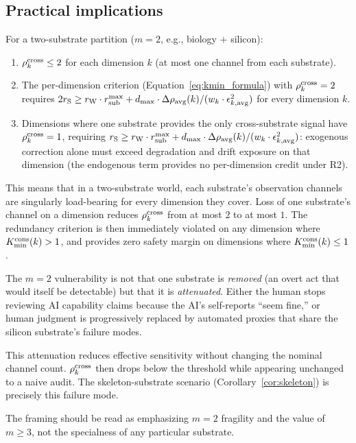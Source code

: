 \subsection{Practical implications}

\begin{corollary}
\label{cor:two_substrate}
For a two-substrate partition ($m = 2$, e.g., biology $+$ silicon):
\begin{enumerate}
\item $\rho^{\mathrm{cross}}_k \leq 2$ for each dimension $k$ (at most one channel
  from each substrate).
\item The per-dimension criterion
  (Equation~\ref{eq:kmin_formula}) with $\rho^{\mathrm{cross}}_k = 2$ requires
  $2 r_{\mathrm{S}} \geq r_{\mathrm{W}} \cdot r_{\mathrm{sub}}^{\max} + d_{\mathrm{max}} \cdot
  \Delta\rho_{\mathrm{avg}}(k) / (w_k \cdot \epsilon_{k,\mathrm{avg}}^2)$
  for every dimension $k$.
\item Dimensions where one substrate provides the only cross-substrate
  signal have $\rho^{\mathrm{cross}}_k = 1$, requiring $r_{\mathrm{S}} \geq r_{\mathrm{W}} \cdot
  r_{\mathrm{sub}}^{\max} + d_{\mathrm{max}} \cdot \Delta\rho_{\mathrm{avg}}(k) / (w_k
  \cdot \epsilon_{k,\mathrm{avg}}^2)$: exogenous correction alone
  must exceed degradation and drift exposure on that dimension
  (the endogenous term provides no per-dimension credit under R2).
\end{enumerate}
\end{corollary}

This means that in a two-substrate world, each substrate's
observation channels are singularly load-bearing for every dimension
they cover.  Loss of one substrate's channel on a dimension reduces
$\rho^{\mathrm{cross}}_k$ from at most $2$ to at most $1$.  The redundancy
criterion is then immediately violated on any dimension where
$K_{\mathrm{min}}^{\mathrm{cons}}(k) > 1$, and provides zero safety margin on dimensions
where $K_{\mathrm{min}}^{\mathrm{cons}}(k) \leq 1$.

\begin{remark}
\label{rem:attenuation}
The $m = 2$ vulnerability is not that one substrate is \emph{removed}
(an overt act that would itself be detectable) but that it is
\emph{attenuated}.  Either the human stops reviewing AI capability
claims because the AI's self-reports ``seem fine,'' or human judgment
is progressively replaced by automated proxies that share the silicon
substrate's failure modes.

This attenuation reduces effective sensitivity without changing the
nominal channel count.  $\rho^{\mathrm{cross}}_k$ then drops below the threshold
while appearing unchanged to a naive audit.  The skeleton-substrate
scenario (Corollary~\ref{cor:skeleton}) is precisely this failure
mode.

The framing should be read as emphasizing $m = 2$ fragility and the
value of $m \geq 3$, not the specialness of any particular substrate.
\end{remark}

